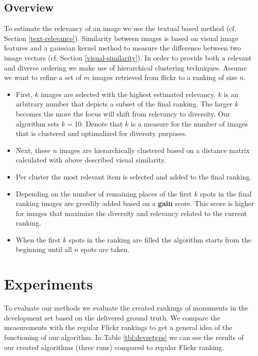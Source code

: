 \documentclass{acm_proc_article-me11_tweaked}
\begin{document}
\subsection{Overview}
To estimate the relevancy of an image we use the textual based method (cf. Section \ref{text-relevance}).
Similarity between images is based on visual image features and a gaussian kernel method to measure the difference between two image vectors (cf. Section \ref{visual-similarity}).
In order to provide both a relevant and diverse ordering we make use of hierarchical clustering techniques.
Assume we want to refine a set of $m$ images retrieved from flickr to a ranking of size $n$.
\begin{itemize}
 \item First, $k$ images are selected with the highest estimated relevancy. $k$ is an arbitrary number that depicts a subset of the final ranking. 
 The larger $k$ becomes the more the focus will shift from relevancy to diversity. Our algorithm sets $k = 10$. Denote that $k$ is a measure for the number of images that is clustered and optimalized for diversity purposes.
 \item Next, these $n$ images are hierarchically clustered based on a distance matrix calculated with above described visual similarity.
 \item Per cluster the most relevant item is selected and added to the final ranking.
 \item Depending on the number of remaining places of the first $k$ spots in the final ranking images are greedily added based on a \textbf{gain} score.
 This score is higher for images that maximize the diversity and relevancy related to the current ranking.
 \item When the first $k$ spots in the ranking are filled the algorithm starts from the beginning until all $n$ spots are taken.
 
\end{itemize}




\section{Experiments}
To evaluate our methods we evaluate the created rankings of monuments in the development set based on the delivered ground truth.
We compare the measurements with the regular Flickr rankings to get a general idea of the functioning of our algorithm.
In Table \ref{tbl:devsetgps} we can see the results of our created algorithms (three runs) compared to regular Flickr ranking.
\end{document}
